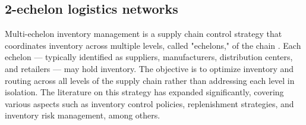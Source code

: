 \documentclass[preprint,11pt,authoryear]{elsarticle}
\begin{document}

\subsection{2-echelon logistics networks}

Multi-echelon inventory management is a supply chain control strategy that coordinates inventory across multiple levels, called "echelons," of the chain \citep{Clark60}. Each echelon — typically identified as suppliers, manufacturers, distribution centers, and retailers — may hold inventory. The objective is to optimize inventory and routing across all levels of the supply chain rather than addressing each level in isolation. The literature on this strategy has expanded significantly, covering various aspects such as inventory control policies, replenishment strategies, and inventory risk management, among others. 
\end{document}
